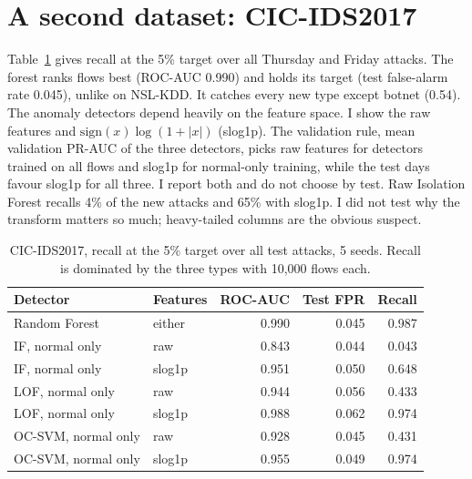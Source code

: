 \documentclass[10pt]{article}
\begin{document}
\section{A second dataset: CIC-IDS2017}

Table~\ref{tab:cic} gives recall at the 5\% target over all Thursday and Friday attacks. The forest ranks flows
best (ROC-AUC 0.990) and holds its target (test false-alarm rate 0.045), unlike on NSL-KDD. It catches every new type except botnet (0.54).
The anomaly detectors depend heavily on the feature space. I show the raw features and
$\mathrm{sign}(x)\log(1+|x|)$ (slog1p). The validation rule, mean validation PR-AUC of the three detectors, picks raw
features for detectors trained on all flows and slog1p for normal-only training, while the test days favour
slog1p for all three. I report both and do not choose by test. Raw Isolation Forest recalls 4\% of the new
attacks and 65\% with slog1p. I did not test why the transform matters so much; heavy-tailed columns are the
obvious suspect.

\begin{table}[t]
\centering\small
\begin{tabular}{llrrr}
\toprule
Detector & Features & ROC-AUC & Test FPR & Recall\\
\midrule
Random Forest & either & 0.990 & 0.045 & 0.987\\
IF, normal only & raw & 0.843 & 0.044 & 0.043\\
IF, normal only & slog1p & 0.951 & 0.050 & 0.648\\
LOF, normal only & raw & 0.944 & 0.056 & 0.433\\
LOF, normal only & slog1p & 0.988 & 0.062 & 0.974\\
OC-SVM, normal only & raw & 0.928 & 0.045 & 0.431\\
OC-SVM, normal only & slog1p & 0.955 & 0.049 & 0.974\\
\bottomrule
\end{tabular}
\caption{CIC-IDS2017, recall at the 5\% target over all test attacks, 5 seeds. Recall is dominated by the three
types with 10,000 flows each.}
\label{tab:cic}
\end{table}
\end{document}
